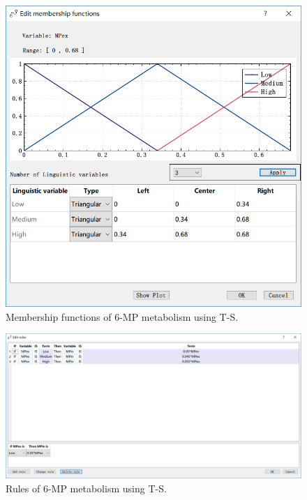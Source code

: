 \documentclass[journal,a4paper,onecolumn]{article}
\begin{document}
\begin{figure}[!hbt]
	\begin{center}
		\includegraphics[width=\columnwidth]{fig57}
		\caption{Membership functions of 6-MP metabolism using T-S.}
		\label{fig:Membership functions of 6-MP metabolism using T-S.}
	\end{center}
\end{figure}
\begin{figure}[!hbt]
	\begin{center}
		\includegraphics[width=\columnwidth]{fig60}
		\caption{Rules of 6-MP metabolism using T-S.}
		\label{fig:Rules of 6-MP metabolism using T-S.}
	\end{center}
\end{figure}
\end{document}
